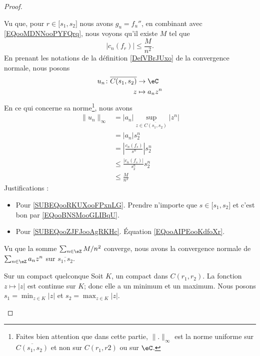 \begin{proof}
\begin{subproof}
\begin{subproof}
            Vu que, pour \( r\in\mathopen[ s_1 , s_2 \mathclose]\) nous avons \( g_u=f_u''\), en combinant avec \eqref{EQooMDNNooPYFQrq}, nous voyons qu'il existe \( M\) tel que
            \begin{equation}        \label{EQooAIPEooKdfoXr}
                | c_n(f_r) |\leq \frac{ M }{ n^2 }.
            \end{equation}
            En prenant les notations de la définition \ref{DefVBrJUxo} de la convergence normale, nous posons
            \begin{equation}
                \begin{aligned}
                    u_n\colon \overline{ C(s_1,s_2) }&\to \eC \\
                    z&\mapsto a_nz^n 
                \end{aligned}
            \end{equation}
            En ce qui concerne sa norme\footnote{Faites bien attention que dans cette partie, \( \| . \|_{\infty}\) est la norme uniforme sur \( \overline{ C(s_1,s_2) }\) et non sur \( C(r_1,r2)\) ou sur \( \eC\).}, nous avons
            \begin{subequations}
                \begin{align}
                \| u_n \|_{\infty}&=| a_n |\sup_{z\in\overline{ C(s_1,s_2) }}| z^n |\\
                &=| a_n |s_2^n\\
                &=\left| \frac{ c_n(f_s) }{ s^n } \right| s_2^n     \label{SUBEQooRKUXooFPxnLG}\\
                &\leq \frac{ | c_n(f_s) | }{ s_2^n } s_2^n\\
                &\leq \frac{ M }{ n^2 }     \label{SUBEQooZJFJooAgRKHc}
                \end{align}
            \end{subequations}
            Justifications :
            \begin{itemize}
                \item Pour \eqref{SUBEQooRKUXooFPxnLG}. Prendre n'importe que \( s\in \mathopen[ s_1 , s_2 \mathclose]\) et c'est bon par \eqref{EQooBNSMooGLIBqU}.
                \item Pour \eqref{SUBEQooZJFJooAgRKHc}. Équation \eqref{EQooAIPEooKdfoXr}.
            \end{itemize}
            Vu que la somme \( \sum_{n\in \eZ}M/n^2\) converge, nous avons la convergence normale de \( \sum_{n\in \eZ}a_nz^n\) sur \( \overline{ s_1,s_2 }\).
        \item[Sur un compact quelconque]
            Soit \( K\), un compact dans \( C(r_1,r_2)\). La fonction \( z\mapsto | z |\) est continue sur \( K\); donc elle a un minimum et un maximum. Nous posons \( s_1=\min_{z\in K}| z |\) et \( s_2=\max_{z\in K}| z |\).


\end{subproof}
\end{subproof}
\end{proof}
